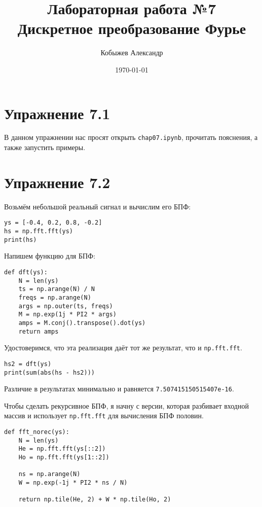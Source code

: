 \documentclass[a4paper,12pt]{report}
\title{Лабораторная работа №7\\Дискретное преобразование Фурье}
\author{Кобыжев Александр}
\date{\today}
\begin{document}
\maketitle
\tableofcontents
\lstlistoflistings

\maketitle

\chapter{Упражнение 7.1}

В данном упражнении нас просят открыть \texttt{chap07.ipynb}, прочитать пояснения, а также запустить примеры.

\chapter{Упражнение 7.2}

Возьмём небольшой реальный сигнал и вычислим его БПФ:

\begin{lstlisting}[caption=Вычисление БПФ при помощи \texttt{np.fft.fft}]
ys = [-0.4, 0.2, 0.8, -0.2]
hs = np.fft.fft(ys)
print(hs)
\end{lstlisting}

Напишем функцию для БПФ:

\begin{lstlisting}[caption=Функция \texttt{dft}]
def dft(ys):
    N = len(ys)
    ts = np.arange(N) / N
    freqs = np.arange(N)
    args = np.outer(ts, freqs)
    M = np.exp(1j * PI2 * args)
    amps = M.conj().transpose().dot(ys)
    return amps
\end{lstlisting}

Удостоверимся, что эта реализация даёт тот же результат, что и \texttt{np.fft.fft}.

\begin{lstlisting}[caption=Сравнение реализаций]
hs2 = dft(ys)
print(sum(abs(hs - hs2)))
\end{lstlisting}

Различие в результатах минимально и равняется \texttt{7.507415150515407e-16}.

Чтобы сделать рекурсивное БПФ, я начну с версии, которая разбивает входной массив и использует \texttt{np.fft.fft} для вычисления БПФ половин.

\begin{lstlisting}[caption=Функция \texttt{fft\_norec}]
def fft_norec(ys):
    N = len(ys)
    He = np.fft.fft(ys[::2])
    Ho = np.fft.fft(ys[1::2])
    
    ns = np.arange(N)
    W = np.exp(-1j * PI2 * ns / N)
    
    return np.tile(He, 2) + W * np.tile(Ho, 2)
\end{lstlisting}
\end{document}
